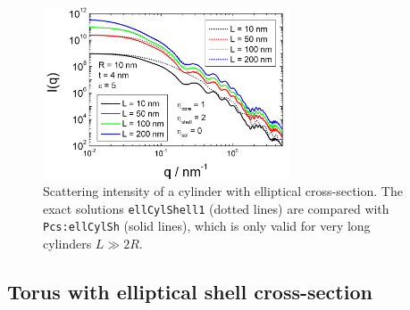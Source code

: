 \begin{figure}[htb]
\begin{center}
\includegraphics[width=0.65\textwidth]{../images/form_factor/cylindrical_obj/Pcs_ellCylShell.png}
\end{center}
\caption{Scattering intensity of a cylinder with elliptical cross-section.
The exact solutions \texttt{ellCylShell1} (dotted lines) are compared
with \texttt{Pcs:ellCylSh} (solid lines), which is only valid for very long cylinders $L \gg 2R$. }
\label{fig:Pcs_ellCylShell}
\end{figure}



\clearpage

\subsection{Torus with elliptical shell cross-section}  \cite{Kawaguchi2001,Forster1999}
\label{sect:Torus}
\hspace{1pt}\\

